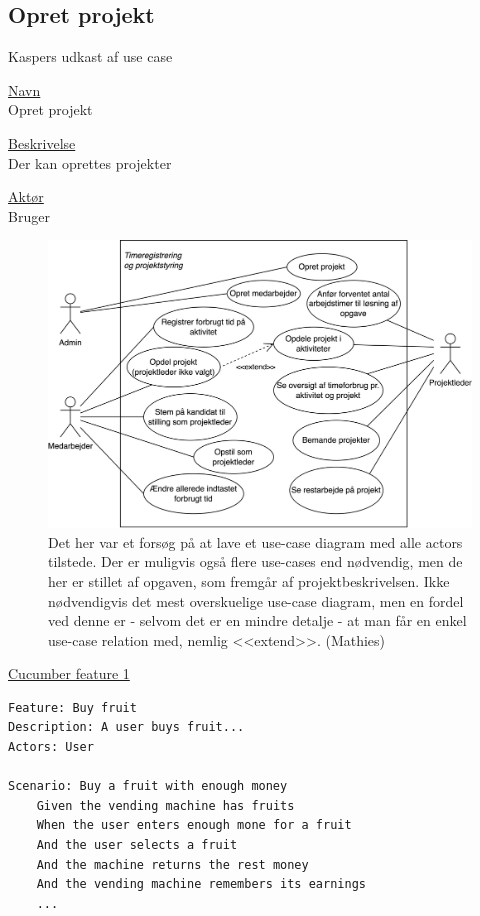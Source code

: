 \subsection{Opret projekt}


\Large{Kaspers udkast af use case}

\normalsize
\underline{Navn} \\
Opret projekt

\underline{Beskrivelse} \\
Der kan oprettes projekter

\underline{Aktør} \\
Bruger

\begin{figure}
    \centering
    \includegraphics{RequirementsAndDesign/diagrams/Timeregistrering og projektstyring.png}
    \caption{Det her var et forsøg på at lave et use-case diagram med alle actors tilstede. Der er muligvis også flere use-cases end nødvendig, men de her er stillet af opgaven, som fremgår af projektbeskrivelsen. Ikke nødvendigvis det mest overskuelige use-case diagram, men en fordel ved denne er - selvom det er en mindre detalje - at man får en enkel use-case relation med, nemlig <<extend>>. (Mathies)}
    \label{AlleActorsPåEnGang}
\end{figure}

\underline{Cucumber feature 1}
\begin{verbatim}
Feature: Buy fruit
Description: A user buys fruit...
Actors: User

Scenario: Buy a fruit with enough money
    Given the vending machine has fruits
    When the user enters enough mone for a fruit
    And the user selects a fruit
    And the machine returns the rest money
    And the vending machine remembers its earnings
    ...
    
\end{verbatim}
